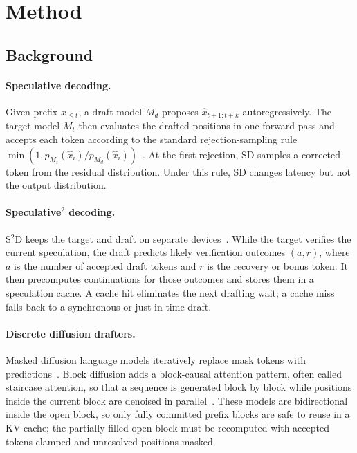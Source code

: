 \section{Method}
\label{sec:method}

\subsection{Background}

\paragraph{Speculative decoding.}
Given prefix $x_{\le t}$, a draft model $M_d$ proposes
$\hat{x}_{t+1:t+k}$ autoregressively. The target model $M_t$ then evaluates
the drafted positions in one forward pass and accepts each token according to
the standard rejection-sampling rule
$\min(1, p_{M_t}(\hat{x}_i)/p_{M_d}(\hat{x}_i))$~\cite{leviathan2023,
chen2023}. At the first rejection, SD samples a corrected token from the
residual distribution. Under this rule, SD changes latency but not the output
distribution.

\paragraph{Speculative$^2$ decoding.}
S$^2$D keeps the target and draft on separate devices~\cite{saguaro2024}.
While the target verifies the current speculation, the draft predicts likely
verification outcomes $(a, r)$, where $a$ is the number of accepted draft
tokens and $r$ is the recovery or bonus token. It then precomputes
continuations for those outcomes and stores them in a speculation cache. A
cache hit eliminates the next drafting wait; a cache miss falls back to a
synchronous or just-in-time draft.

\paragraph{Discrete diffusion drafters.}
Masked diffusion language models iteratively replace mask tokens with
predictions~\cite{sahoo2024}. Block diffusion adds a block-causal attention
pattern, often called staircase attention, so that a sequence is generated
block by block while positions inside the current block are denoised in
parallel~\cite{arriola2025}. These models are bidirectional inside the open
block, so only fully committed prefix blocks are safe to reuse in a KV cache;
the partially filled open block must be recomputed with accepted tokens
clamped and unresolved positions masked.


